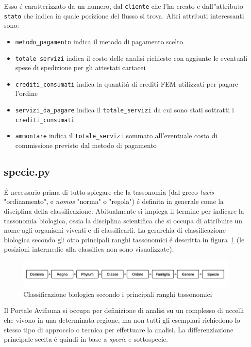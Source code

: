 Esso é caratterizzato da un numero, dal \texttt{cliente} che l'ha creato e dall''attributo \texttt{stato} che indica in quale posizione del flusso si trova.
Altri attributi interessanti sono:
\begin{itemize}
 \item \texttt{metodo\_pagamento} indica il metodo di pagamento scelto
 \item \texttt{totale\_servizi} indica il costo delle analisi richieste con aggiunte le eventuali spese di spedizione per gli attestati cartacei 
 \item \texttt{crediti\_consumati} indica la quantità di crediti FEM utilizzati per pagare l'ordine
 \item \texttt{servizi\_da\_pagare} indica il  \texttt{totale\_servizi} da cui sono stati sottratti i \texttt{crediti\_consumati}
 \item \texttt{ammontare} indica il \texttt{totale\_servizi} sommato all'eventuale costo di commissione previsto dal metodo di pagamento
\end{itemize}

\subsection*{specie.py}
\label{subs:specie}

É necessario prima di tutto spiegare che la tassonomia (dal greco \emph{taxis} "ordinamento", e \emph{nomos} "norma" o "regola") é definita in generale come la disciplina della classificazione. Abitualmente si impiega il termine per indicare la tassonomia biologica, ossia la disciplina scientifica che si occupa di attribuire un nome agli organismi viventi e di classificarli. La gerarchia di classificazione biologica secondo gli otto principali ranghi tassonomici é descritta in figura~\ref{fig:tassonomia} (le posizioni intermedie alla classifica non sono visualizzate).

\begin{figure}
 \includegraphics[width=1\textwidth]{images/tassonomia} 
 \caption{Classificazione biologica secondo i principali ranghi tassonomici}
 \label{fig:tassonomia}
\end{figure}

Il Portale Avifauna si occupa per definizione di analisi su un complesso di uccelli che vivono in una determinata regione, ma non tutti gli esemplari richiedono lo stesso tipo di approccio o tecnica per effettuare la analisi. La differenziazione principale scelta é quindi in base a \emph{specie} e sottospecie.

